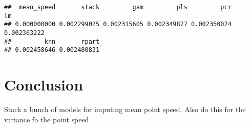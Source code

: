 \documentclass[]{article}
\newenvironment{Shaded}{\begin{snugshade}}{\end{snugshade}}
\newcommand{\DataTypeTok}[1]{\textcolor[rgb]{0.13,0.29,0.53}{#1}}
\newcommand{\DecValTok}[1]{\textcolor[rgb]{0.00,0.00,0.81}{#1}}
\newcommand{\KeywordTok}[1]{\textcolor[rgb]{0.13,0.29,0.53}{\textbf{#1}}}
\newcommand{\NormalTok}[1]{#1}
\newcommand{\OperatorTok}[1]{\textcolor[rgb]{0.81,0.36,0.00}{\textbf{#1}}}
\newcommand{\StringTok}[1]{\textcolor[rgb]{0.31,0.60,0.02}{#1}}
\begin{document}
\begin{Shaded}
\end{Shaded}

\begin{verbatim}
##  mean_speed       stack         gam         pls         pcr          lm 
## 0.000000000 0.002299025 0.002315605 0.002349877 0.002350024 0.002363222 
##         knn       rpart 
## 0.002458646 0.002480831
\end{verbatim}

\hypertarget{conclusion}{%
\section{Conclusion}\label{conclusion}}

Stack a bunch of models for imputing mean point speed. Also do this for
the variance fo the point speed.
\end{document}
